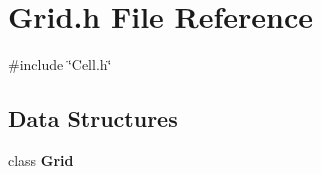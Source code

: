 \section{Grid.\+h File Reference}
\label{Grid_8h}
{\ttfamily \#include \char`\"{}Cell.\+h\char`\"{}}\newline
\subsection*{Data Structures}
\begin{DoxyCompactItemize}
\item 
class \textbf{ Grid}
\end{DoxyCompactItemize}
